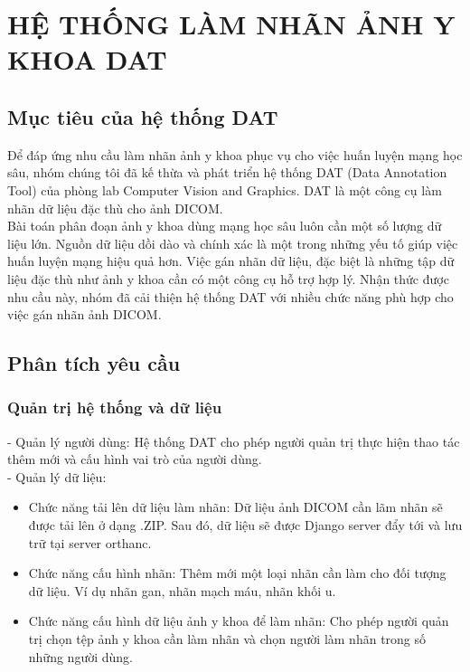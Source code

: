 \chapter{HỆ THỐNG LÀM NHÃN ẢNH Y KHOA DAT}\label{chapter:architecture}

\section{Mục tiêu của hệ thống DAT}
Để đáp ứng nhu cầu làm nhãn ảnh y khoa phục vụ cho việc huấn luyện mạng học sâu, nhóm chúng tôi đã kế thừa và phát triển hệ thống DAT (Data Annotation Tool) của phòng lab Computer Vision and Graphics. DAT là một công cụ làm nhãn dữ liệu đặc thù cho ảnh DICOM. \\
\indent Bài toán phân đoạn ảnh y khoa dùng mạng học sâu luôn cần một số lượng dữ liệu lớn. Nguồn dữ liệu dồi dào và chính xác là một trong những yếu tố giúp việc huấn luyện mạng hiệu quả hơn. Việc gán nhãn dữ liệu, đặc biệt là những tập dữ liệu đặc thù như ảnh y khoa cần có một công cụ hỗ trợ hợp lý. Nhận thức được nhu cầu này, nhóm đã cải thiện hệ thống DAT với nhiều chức năng phù hợp cho việc gán nhãn ảnh DICOM.

\section{Phân tích yêu cầu}
\subsection{Quản trị hệ thống và dữ liệu}
\noindent- Quản lý người dùng:  Hệ thống DAT cho phép người quản trị thực hiện thao tác thêm mới và cấu hình vai trò của người dùng. \\
- Quản lý dữ liệu: 
\begin{itemize}
    \item Chức năng tải lên dữ liệu làm nhãn: Dữ liệu ảnh DICOM cần lãm nhãn sẽ được tải lên ở dạng .ZIP. Sau đó, dữ liệu sẽ được Django server đẩy tới và lưu trữ tại server orthanc.
    \item Chức năng cấu hình nhãn: Thêm mới một loại nhãn cần làm cho đối tượng dữ liệu. Ví dụ nhãn gan, nhãn mạch máu, nhãn khối u. 
    \item Chức năng cấu hình dữ liệu ảnh y khoa để làm nhãn: Cho phép người quản trị chọn tệp ảnh y khoa cần làm nhãn và chọn người làm nhãn trong số những người dùng. 
\end{itemize}
